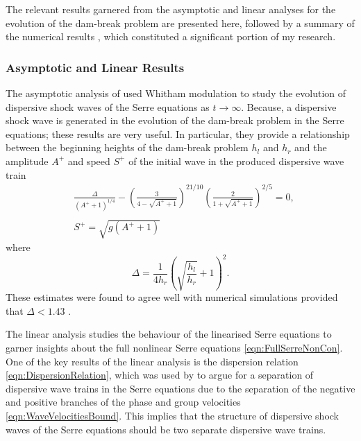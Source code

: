 The relevant results garnered from the asymptotic \cite{El-etal-2006} and linear \cite{Dougalis-etal-2007} analyses for the evolution of the dam-break problem are presented here, followed by a summary of the numerical results \cite{Pitt-2018-61}, which constituted a significant portion of my research. 

\subsubsection{Asymptotic and Linear Results}
The asymptotic analysis of \citet{El-etal-2006} used Whitham modulation to study the evolution of dispersive shock waves of the Serre equations as $t\rightarrow \infty$. Because, a dispersive shock wave is generated in the evolution of the dam-break problem in the Serre equations; these results are very useful. In particular, they provide a relationship between the beginning heights of the dam-break problem $h_l$ and $h_r$ and the amplitude $A^+$ and speed $S^+$ of the initial wave in the produced dispersive wave train 
\begin{subequations}
	\begin{align}
	&\frac{\Delta}{\left(A^+ + 1\right)^{1/4}} - \left(\frac{3}{4 -  \sqrt{A^+ + 1}}\right)^{21/10} \left(\frac{2}{1 + \sqrt{A^+ + 1}}\right)^{2/5} = 0,	\label{eqn:Aplusdef} \\  \nonumber \\
	&S^+ = \sqrt{g \left(A^+ + 1\right)}	\label{eqn:Splusdef}
	\end{align}
	\label{eqn:ELWhitMod}	
\end{subequations}
where
\begin{equation*}
\Delta = \frac{1}{4 h_r}\left(\sqrt{\dfrac{h_l}{h_r}} + 1\right)^2.
\end{equation*}
These estimates were found to agree well with numerical simulations provided that $\Delta < 1.43$ \cite{El-etal-2006}.

The linear analysis studies the behaviour of the linearised Serre equations to garner insights about the full nonlinear Serre equations \eqref{eqn:FullSerreNonCon}. One of the key results of the linear analysis is the dispersion relation \eqref{eqn:DispersionRelation}, which was used by \citet{Dougalis-etal-2007} to argue for a separation of dispersive wave trains in the Serre equations due to the separation of the negative and positive branches of the phase and group velocities \eqref{eqn:WaveVelocitiesBound}. This implies that the structure of dispersive shock waves of the Serre equations should be two separate dispersive wave trains.


